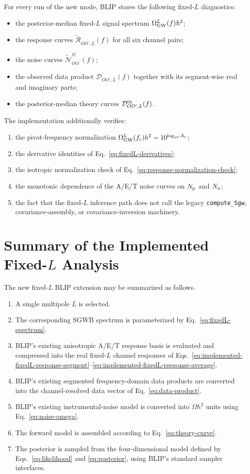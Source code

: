 \documentclass[11pt]{article}
\newcommand{\OmL}{\Omega_{\rm GW}^{L}}
\newcommand{\fc}{f_{\rm c}}
\newcommand{\Rsp}{\widetilde{\mathcal{R}}}
\newcommand{\Ntil}{\widetilde{\mathcal{N}}}
\newcommand{\Dobs}{\mathcal{D}}
\newcommand{\Dth}{\mathcal{D}^{\rm th}}
\newcommand{\OO}{OO^\prime}
\begin{document}
For every run of the new mode, BLIP stores the following fixed-$L$ diagnostics:
\begin{itemize}[leftmargin=2em]
  \item the posterior-median fixed-$L$ signal spectrum $\OmL(f)h^2$;
  \item the response curves $\Rsp_{\OO,L}(f)$ for all six channel pairs;
  \item the noise curves $\Ntil^\Omega_{\OO}(f)$;
  \item the observed data product $\Dobs_{\OO,L}(f)$ together with its segment-wise real and imaginary parts;
  \item the posterior-median theory curves $\Dth_{\OO,L}(f)$.
\end{itemize}
The implementation additionally verifies:
\begin{enumerate}[leftmargin=2.5em]
  \item the pivot-frequency normalization $\OmL(\fc)h^2 = 10^{\log_{10}A_{\rm c}}$;
  \item the derivative identities of Eq.~\eqref{eq:fixedL-derivatives};
  \item the isotropic normalization check of Eq.~\eqref{eq:response-normalization-check};
  \item the monotonic dependence of the A/E/T noise curves on $N_{\rm p}$ and $N_{\rm a}$;
  \item the fact that the fixed-$L$ inference path does not call the legacy \texttt{compute\_Sgw}, covariance-assembly, or covariance-inversion machinery.
\end{enumerate}

\section{Summary of the Implemented Fixed-$L$ Analysis}

The new fixed-$L$ BLIP extension may be summarized as follows.
\begin{enumerate}[leftmargin=2.5em]
  \item A single multipole $L$ is selected.
  \item The corresponding SGWB spectrum is parameterized by Eq.~\eqref{eq:fixedL-spectrum}.
  \item BLIP's existing anisotropic A/E/T response basis is evaluated and compressed into the real fixed-$L$ channel responses of Eqs.~\eqref{eq:implemented-fixedL-response-segment}--\eqref{eq:implemented-fixedL-response-average}.
  \item BLIP's existing segmented frequency-domain data products are converted into the channel-resolved data vector of Eq.~\eqref{eq:data-product}.
  \item BLIP's existing instrumental-noise model is converted into $\Omega h^2$ units using Eq.~\eqref{eq:noise-omega}.
  \item The forward model is assembled according to Eq.~\eqref{eq:theory-curve}.
  \item The posterior is sampled from the four-dimensional model defined by Eqs.~\eqref{eq:likelihood} and \eqref{eq:posterior}, using BLIP's standard sampler interfaces.
\end{enumerate}
\end{document}
